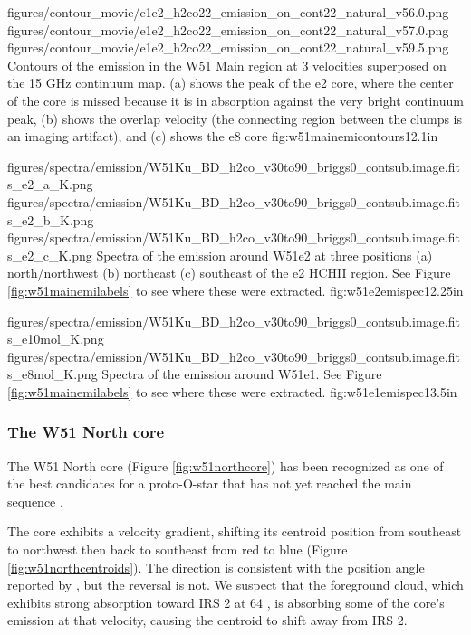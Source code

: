 \FigureThreeAA
{figures/contour_movie/e1e2_h2co22_emission_on_cont22_natural_v56.0.png}
{figures/contour_movie/e1e2_h2co22_emission_on_cont22_natural_v57.0.png}
{figures/contour_movie/e1e2_h2co22_emission_on_cont22_natural_v59.5.png}
{Contours of the \formaldehyde \twotwo emission in the W51 Main region at 3
velocities superposed on the 15 GHz continuum map.  (a) shows the peak of the e2
core, where the center of the core is missed because it is in absorption
against the very bright continuum peak, (b) shows the overlap velocity (the
connecting region between the clumps is an imaging artifact),
and (c) shows the e8 core}
{fig:w51mainemicontours}{1}{2.1in}

\FigureThreeAA
{figures/spectra/emission/W51Ku_BD_h2co_v30to90_briggs0_contsub.image.fits_e2_a_K.png}
{figures/spectra/emission/W51Ku_BD_h2co_v30to90_briggs0_contsub.image.fits_e2_b_K.png}
{figures/spectra/emission/W51Ku_BD_h2co_v30to90_briggs0_contsub.image.fits_e2_c_K.png}
{Spectra of the \twotwo emission around W51e2 at three positions (a)
north/northwest (b) northeast (c) southeast of the e2 HCHII region.  See Figure
\ref{fig:w51mainemilabels} to see where these were extracted.}
{fig:w51e2emispec}{1}{2.25in}

\FigureTwoAA
{figures/spectra/emission/W51Ku_BD_h2co_v30to90_briggs0_contsub.image.fits_e10mol_K.png}
{figures/spectra/emission/W51Ku_BD_h2co_v30to90_briggs0_contsub.image.fits_e8mol_K.png}
{Spectra of the \twotwo emission around W51e1.  See Figure
\ref{fig:w51mainemilabels} to see where these were extracted.
}
{fig:w51e1emispec}{1}{3.5in}


\subsubsection{The W51 North core}
\label{sec:northcore}
The W51 North core (Figure \ref{fig:w51northcore}) has been recognized as one
of the best candidates for a proto-O-star that has not yet reached the main
sequence \citep{Zapata2009a,Zapata2010a,Goddi2015a}.  

The core exhibits a velocity gradient, shifting its centroid position from
southeast to northwest then back to southeast from red to blue (Figure
\ref{fig:w51northcentroids}).  The direction is consistent
with the position angle reported by \citet{Zapata2010a}, but the reversal is
not.  We suspect that the foreground cloud, which exhibits strong absorption
toward IRS 2 at 64 \kms, is absorbing some of the core's emission at that
velocity, causing the centroid to shift away from IRS 2.

